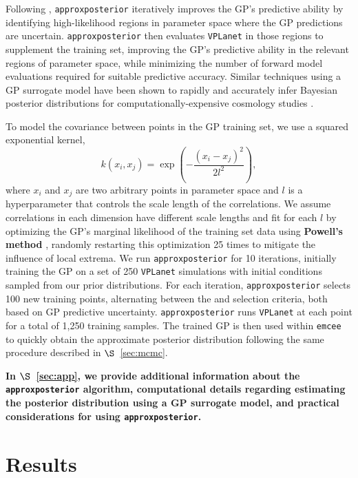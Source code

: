 \documentclass[twocolumn]{aastex62}
\newcommand{\xxx}[1]{{\textbf{#1}}}
\newcommand{\vplanet}[0]{\texttt{VPLanet}\xspace}
\newcommand{\emcee}[0]{\texttt{emcee}\xspace}
\newcommand{\approxposterior}[0]{\texttt{approxposterior}\xspace}
\begin{document}
Following \citet{Kandasamy2017}, \approxposterior iteratively improves the GP's predictive ability by identifying high-likelihood regions in parameter space where the GP predictions are uncertain. \approxposterior then evaluates \vplanet in those regions to supplement the training set, improving the GP's predictive ability in the relevant regions of parameter space, while minimizing the number of forward model evaluations required for suitable predictive accuracy. Similar techniques using a GP surrogate model have been shown to rapidly and accurately infer Bayesian posterior distributions for computationally-expensive cosmology studies \citep[e.g.][]{Bird2019}. 

To model the covariance between points in the GP training set, we use a squared exponential kernel,
\begin{equation} \label{eqn:kernel}
k(x_i, x_j) = \exp \left( - \frac{(x_i - x_j)^2}{2l^2} \right),
\end{equation}
where $x_i$ and $x_j$ are two arbitrary points in parameter space and $l$ is a hyperparameter that controls the scale length of the correlations. We assume correlations in each dimension have different scale lengths and fit for each $l$ by optimizing the GP's marginal likelihood of the training set data using \xxx{Powell's method} \citep{Powell1964}, randomly restarting this optimization 25 times to mitigate the influence of local extrema. We run \approxposterior for 10 iterations, initially training the GP on a set of 250 \vplanet simulations with initial conditions sampled from our prior distributions. For each iteration, \approxposterior selects 100 new training points, alternating between the \citet{Kandasamy2017} and \citet{Wang2018} selection criteria, both based on GP predictive uncertainty. \approxposterior runs \vplanet at each point for a total of 1,250 training samples. The trained GP is then used within \emcee to quickly obtain the approximate posterior distribution following the same procedure described in $\S$~\ref{sec:mcmc}. 

\xxx{In $\S$~\ref{sec:app}, we provide additional information about the \approxposterior algorithm, computational details regarding estimating the posterior distribution using a GP surrogate model, and practical considerations for using \approxposterior.}


\section{Results} \label{sec:results}
\end{document}
